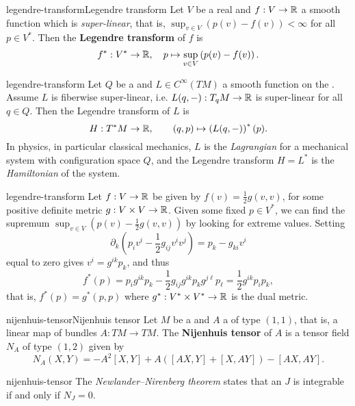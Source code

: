 \begin{topic}{legendre-transform}{Legendre transform}
    Let $V$ be a real  and $f : V \to \mathbb{R}$ a smooth function which is \textit{super-linear}, that is, $\sup_{v \in V} \left(p(v) - f(v) \right) < \infty$ for all $p \in V^*$. Then the \textbf{Legendre transform} of $f$ is
    \[ f^* : V^* \to \mathbb{R}, \quad p \mapsto \sup_{v \in V} \left(p(v) - f(v) \right) . \]
\end{topic}

\begin{example}{legendre-transform}
    Let $Q$ be a  and $L \in C^\infty(TM)$ a smooth function on the . Assume $L$ is fiberwise super-linear, i.e. $L(q, -) : T_q M \to \mathbb{R}$ is super-linear for all $q \in Q$. Then the Legendre transform of $L$ is
    \[ H : T^*M \to \mathbb{R}, \qquad (q, p) \mapsto \left(L(q, -)\right)^*(p) . \]
    In physics, in particular classical mechanics, $L$ is the \textit{Lagrangian} for a mechanical system with configuration space $Q$, and the Legendre transform $H = L^*$ is the \textit{Hamiltonian} of the system.
\end{example}

\begin{example}{legendre-transform}
    Let $f : V \to \mathbb{R}$ be given by $f(v) = \tfrac{1}{2} g(v, v)$, for some positive definite metric $g : V \times V \to \mathbb{R}$. Given some fixed $p \in V^*$, we can find the supremum $\sup_{v \in V} \left(p(v) - \tfrac{1}{2} g(v, v)\right)$ by looking for extreme values. Setting
    \[ \partial_k \left( p_i v^i - \frac{1}{2} g_{ij} v^i v^j \right) = p_k - g_{ki} v^i \]
    equal to zero gives $v^i = g^{ik} p_k$, and thus
    \[ f^*(p) = p_i g^{ik} p_k - \frac{1}{2} g_{ij} g^{i k} p_k g^{j \ell} p_\ell = \frac{1}{2} g^{ik} p_i p_k , \]
    that is, $f^*(p) = g^*(p, p)$ where $g^* : V^* \times V^* \to \mathbb{R}$ is the dual metric.
\end{example}

\begin{topic}{nijenhuis-tensor}{Nijenhuis tensor}
    Let $M$ be a  and $A$ a  of type $(1, 1)$, that is, a linear map of bundles $A : TM \to TM$. The \textbf{Nijenhuis tensor} of $A$ is a tensor field $N_A$ of type $(1, 2)$ given by
    \[ N_A(X, Y) = -A^2 [X, Y] + A([AX, Y] + [X, AY]) - [AX, AY] . \]
\end{topic}

\begin{example}{nijenhuis-tensor}
    The \textit{Newlander–Nirenberg theorem} states that an  $J$ is integrable if and only if $N_J = 0$.
\end{example}

